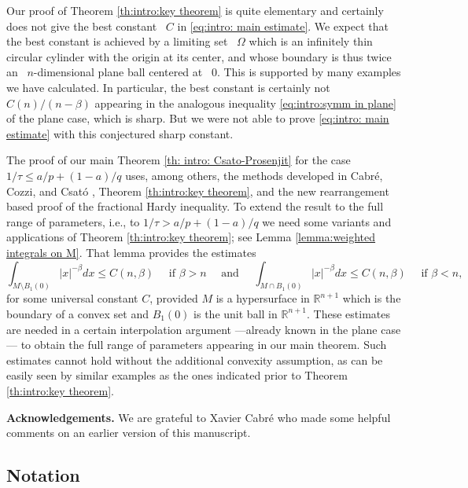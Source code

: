 \documentclass[reqno,12pt]{amsart}
\newcommand{\R}{\mathbb{R}}
\numberwithin{equation}{section}
\theoremstyle{plain}
\theoremstyle{definition}
\renewcommand{\leq}{\leqslant}
\begin{document}
Our proof of Theorem \ref{th:intro:key theorem} is quite elementary and certainly does not give the best constant ~$C$ in \eqref{eq:intro: main estimate}. We expect that the best constant is achieved by a limiting set ~$\Omega$ which is an infinitely thin circular cylinder with the origin at its center, and whose boundary is thus twice an ~$n$-dimensional plane ball centered at ~$0$. This is supported by many examples we have calculated. In particular, the best constant is certainly not ~$C(n)/(n-\beta)$ appearing in the analogous inequality \eqref{eq:intro:symm in plane} of the plane case, which is sharp. But we were not able to prove \eqref{eq:intro: main estimate} with this conjectured sharp constant. 

The proof of our main Theorem \ref{th: intro: Csato-Prosenjit} for the case $1/\tau\leq a/p+(1-a)/q$ uses, among others, the methods developed in Cabr\'e, Cozzi, and Csat\'o \cite{Cabre-Cozzi-Csato}, Theorem \ref{th:intro:key theorem}, and the new rearrangement based proof of the fractional Hardy inequality. To extend the result to the full range of parameters, i.e., to $1/\tau > a/p+(1-a)/q$ we need some variants and applications of Theorem \ref{th:intro:key theorem}; see Lemma \ref{lemma:weighted integrals on M}. That lemma provides the estimates
$$
   \int_{M\setminus B_1(0)}|x|^{-\beta}dx\leq C(n,\beta)\quad \text{ if }\beta>n\quad\text{ and }
   \quad\int_{M\cap B_1(0)}|x|^{-\beta}dx\leq C(n,\beta)\quad \text{ if }\beta<n,
$$
for some universal constant $C$,
provided $M$ is a hypersurface in $\R^{n+1}$ which is the boundary of a convex set and $B_1(0)$ is the unit ball in $\R^{n+1}.$ These estimates are needed in a certain interpolation argument ---already known in the plane case--- to obtain the full range of parameters appearing in our main theorem. Such estimates cannot hold without the additional convexity assumption, as can be easily seen by similar examples as the ones indicated prior to Theorem \ref{th:intro:key theorem}.

\bigskip

\noindent\textbf{Acknowledgements.} We are grateful to Xavier Cabr\'e who made some helpful comments on an earlier version of this manuscript. 




\subsection{Notation}
\end{document}

